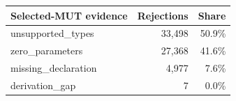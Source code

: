   \renewcommand{\theHreporttablerow}{rq6_parameter_type_rejections.\arabic{reporttablerow}}
  \setcounter{reporttablerow}{0}
  \begin{tabular}{lrr}
  \toprule
  Selected-MUT evidence & Rejections & Share \\
  \midrule
  {reporttablerow}\label{tabrow:rq6_parameter_type_rejections:unsupported_types}unsupported\_types & 33,498 & 50.9\% \\
  {reporttablerow}\label{tabrow:rq6_parameter_type_rejections:zero_parameters}zero\_parameters & 27,368 & 41.6\% \\
  {reporttablerow}\label{tabrow:rq6_parameter_type_rejections:missing_declaration}missing\_declaration & 4,977 & 7.6\% \\
  {reporttablerow}\label{tabrow:rq6_parameter_type_rejections:derivation_gap}derivation\_gap & 7 & 0.0\% \\
  \bottomrule
  \end{tabular}
